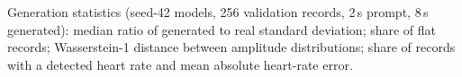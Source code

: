 \begin{table}[htbp]
\centering
\caption[Generators: generation statistics]{Generation statistics (seed-42 models, 256 validation records, 2\,s prompt, 8\,s generated): median ratio of generated to real standard deviation; share of flat records; Wasserstein-1 distance between amplitude distributions; share of records with a detected heart rate and mean absolute heart-rate error.}
\label{tab:generative_sampling}
\small
\begin{adjustbox}{max width=\textwidth}

\end{adjustbox}
\end{table}
